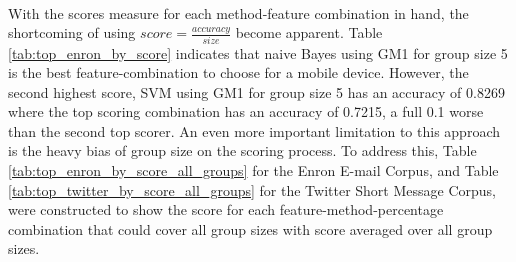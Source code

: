 \paragraph{} With the scores measure for each method-feature combination in hand, the shortcoming of using $score = \frac{accuracy}{size}$ become apparent.  Table \ref{tab:top_enron_by_score} indicates that naive Bayes using GM1 for group size 5 is the best feature-combination to choose for a mobile device.  However, the second highest score, SVM using GM1 for group size 5 has an accuracy of 0.8269 where the top scoring combination has an accuracy of 0.7215, a full 0.1 worse than the second top scorer.  An even more important limitation to this approach is the heavy bias of group size on the scoring process.  To address this, Table \ref{tab:top_enron_by_score_all_groups} for the Enron E-mail Corpus, and Table \ref{tab:top_twitter_by_score_all_groups} for the Twitter Short Message Corpus, were constructed to show the score for each feature-method-percentage combination that could cover all group sizes with score averaged over all group sizes.

